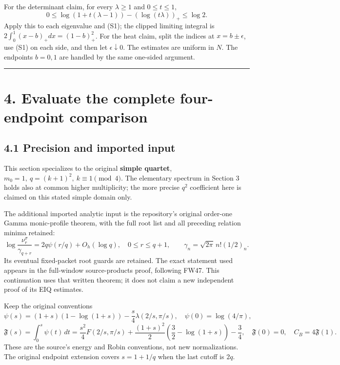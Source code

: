 \documentclass[11pt]{article}
\begin{document}
For the determinant claim, for every \(\lambda\ge1\) and \(0\le t\le1\), \[
 0\le\log(1+t(\lambda-1))-(\log(t\lambda))_+\le\log2.
\] Apply this to each eigenvalue and (S1); the clipped limiting integral is \(2\int_0^1(x-b)_+dx=(1-b)_+^2\). For the heat claim, split the indices at \(x=b\pm\epsilon\), use (S1) on each side, and then let \(\epsilon\downarrow0\). The estimates are uniform in \(N\). The endpoints \(b=0,1\) are handled by the same one-sided argument.

\begin{center}\rule{0.5\linewidth}{0.5pt}\end{center}

\section{4. Evaluate the complete four-endpoint comparison}\label{evaluate-the-complete-four-endpoint-comparison}

\subsection{4.1 Precision and imported input}\label{precision-and-imported-input}

This section specializes to the original \textbf{simple quartet}, \(m_0=1,\ q=(k+1)^2,\ k\equiv1\pmod4\). The elementary spectrum in Section 3 holds also at common higher multiplicity; the more precise \(q^2\) coefficient here is claimed on this stated simple domain only.

The additional imported analytic input is the repository's original order-one Gamma monic-profile theorem, with the full root list and all preceding relation minima retained: \[
 \log\frac{\nu_r^\sigma}{\gamma_{q+r}}
 =2q\psi(r/q)+O_h(\log q),\quad0\le r\le q+1,\qquad
 \gamma_n=\sqrt{2\pi}\,n!(1/2)_n. \tag{V1}
\] Its eventual fixed-packet root guards are retained. The exact statement used appears in the full-window source-products proof, following FW47. This continuation uses that written theorem; it does not claim a new independent proof of its EIQ estimates.

Keep the original conventions \[
 \psi(s)=(1+s)(1-\log(1+s))-\frac{s}{4}\lambda(2/s,\pi/s),
 \quad \psi(0)=\log(4/\pi),
\] \[
 \mathfrak F(s)=\int_0^s\psi(t)\,dt
 =\frac{s^2}{4}F(2/s,\pi/s)
  +\frac{(1+s)^2}{2}\left(\frac32-\log(1+s)\right)-\frac34,
 \quad \mathfrak F(0)=0,
 \quad C_B=4\mathfrak F(1). \tag{V2}
\] These are the source's energy and Robin conventions, not new normalizations. The original endpoint extension covers \(s=1+1/q\) when the last cutoff is \(2q\).
\end{document}
